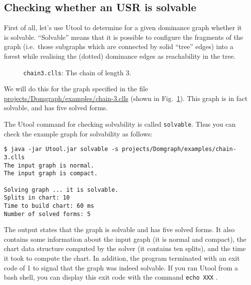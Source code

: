 \subsection{Checking whether an USR is solvable}

First of all, let's use Utool to determine for a given dominance graph
whether it is solvable. ``Solvable'' means that it is possible to
configure the fragments of the graph (i.e.\ those subgraphs which are
connected by solid ``tree'' edges) into a forest while realising the
(dotted) dominance edges as reachability in the tree.

\begin{figure}
\caption{\texttt{chain3.clls}: The chain of length 3.
\label{fig:chain3}}
\end{figure}

We will do this for the graph specified in the file
\url{projects/Domgraph/examples/chain-3.clls} (shown in
Fig.~\ref{fig:chain3}). This graph is in fact solvable, and has five
solved forms.

The Utool command for checking solvability is called
\verb?solvable?. Thus you can check the example graph for solvability
as follows:

\begin{verbatim}
$ java -jar Utool.jar solvable -s projects/Domgraph/examples/chain-3.clls
The input graph is normal.
The input graph is compact.

Solving graph ... it is solvable.
Splits in chart: 10
Time to build chart: 60 ms
Number of solved forms: 5
\end{verbatim}

The output states that the graph is solvable and has five solved
forms. It also contains some information about the input graph (it is
normal and compact), the chart data structure computed by the solver
(it contains ten splits), and the time it took to compute the
chart. In addition, the program terminated with an exit code of 1 to
signal that the graph was indeed solvable. If you ran Utool from a
bash shell, you can display this exit code with the command
\verb?echo XXX? .

